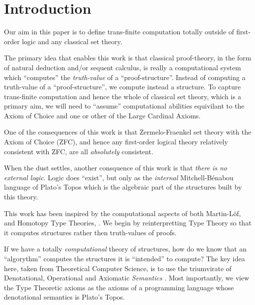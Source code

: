 
\section{Introduction}

Our aim in this paper is to define trans-finite computation totally outside of
first-order logic and any classical set theory.

The primary idea that enables this work is that classical proof-theory, in the
form of natural deduction and/or sequent calculus, is really a computational
system which ``computes'' the \emph{truth-value} of a ``proof-structure''.
Instead of computing a truth-value of a ``proof-structure'', we compute instead
a structure. To capture trans-finite computation and hence the whole of
classical set theory, which is a primary aim, we will need to ``assume''
computational abilities equivilant to the Axiom of Choice and one or other of
the Large Cardinal Axioms.

One of the consequences of this work is that Zermelo-Fraenkel set theory with
the Axiom of Choice (ZFC), and hence any first-order logical theory relatively
consistent with ZFC, are all \emph{absolutely} consistent.

When the dust settles, another consquence of this work is that \emph{there is no
\emph{external} logic}. Logic does ``exist'', but only as the \emph{internal}
Mitchell-B\'enabou language of Plato's Topos which is the algebraic part of the
structures built by this theory.

This work has been inspired by the computational aspects of both Martin-L\"of,
\cite{martinLofSambin1984typeTh, nordstromPeterssonSmith1990typeTh,
thompson1991typeTh, nordstromPeterssonSmith2000typeTh} and Homotopy Type
Theories, \cite{awodeyCoquandVoevodsky2013homotopyTypeTheory}. We begin by
reinterpretting Type Theory so that it computes structures rather then
truth-values of proofs. 

If we have a totally \emph{computational} theory of structures, how do we know
that an ``algorythm'' computes the structures it is ``intended'' to compute? The
key idea here, taken from Theoretical Computer Science, is to use the
triumvirate of Denotational, Operational and Axiomatic \emph{Semantics}
\cite{gunter1992semainticProgrammingLanguages,
winskel1993formalSemanticsProgrammingLanguages, gries1981scienceProgramming}.
Most importantly, we view the Type Theoretic axioms as the axioms of a
programming language whose denotational semantics is Plato's Topos.

